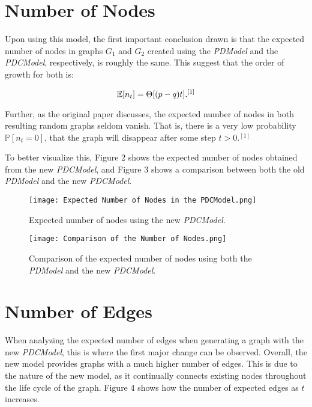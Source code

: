 \documentclass[final,3p,times,twocolumn]{elsarticle}
\begin{document}
\section{Number of Nodes}
\label{S:5}

Upon using this model, the first important conclusion drawn is that the expected number of nodes in graphs $G_1$ and $G_2$ created using the \textit{PDModel} and the \textit{PDCModel}, respectively, is roughly the same. This suggest that the order of growth for both is:

\begin{equation}
\centering
    \mathbb{E}[n_t] = \Theta[(p - q)t].^{[1]}
\end{equation}

Further, as the original paper discusses, the expected number of nodes in both resulting random graphs seldom vanish. That is, there is a very low probability $\mathbb{P}[n_t = 0]$, that the graph will disappear after some step $t > 0$.$^{[1]}$

To better visualize this, Figure 2 shows the expected number of nodes obtained from the new \textit{PDCModel}, and Figure 3 shows a comparison between both the old \textit{PDModel} and the new \textit{PDCModel}.

\begin{figure}[h]
\centering
\texttt{[image: Expected Number of Nodes in the PDCModel.png]}
\caption{Expected number of nodes using the new \textit{PDCModel}.}
\end{figure}

\begin{figure}[h]
\centering
\texttt{[image: Comparison of the Number of Nodes.png]}
\caption{Comparison of the expected number of nodes using both the \textit{PDModel} and the new \textit{PDCModel}.}
\end{figure}

\section{Number of Edges}
\label{S:6}

When analyzing the expected number of edges when generating a graph with the new \textit{PDCModel}, this is where the first major change can be observed. Overall, the new model provides graphs with a much higher number of edges. This is due to the nature of the new model, as it continually connects existing nodes throughout the life cycle of the graph. Figure 4 shows how the number of expected edges as $t$ increases.
\end{document}
